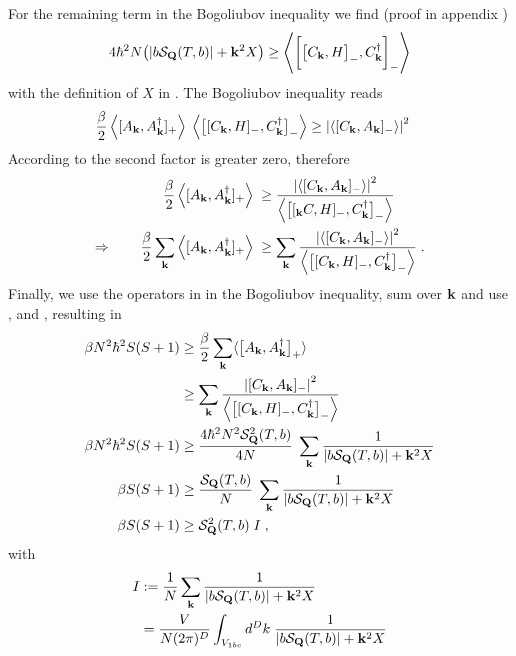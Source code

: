 %
For the remaining term in the Bogoliubov inequality we find (proof in appendix )
%
\begin{align}\label{eq:MW:3}
4 \hbar^{2} N\big( \abs{b {\cal S}_{\mathbf Q}(T,b)} +  \mathbf k^{2} X \big)\ge 
 \left\langle\bigg[ \big[C_{\mathbf k},H  \big]_{-},C^{\dagger}_{\mathbf k} \bigg]_{-}\right\rangle
\end{align}
%
with the definition of $X$ in .
The Bogoliubov inequality reads
%
\begin{align*}
\frac{\beta}{2} \left\langle[A_{\mathbf k},A_{\mathbf k}^{\dagger}]_{+}\right\rangle\;
\left\langle\big[[C_{\mathbf k},H]_{-},C_{\mathbf k}^{\dagger}\big]_{-}\right\rangle &\ge \abs{\left\langle[C_{\mathbf k},A_{\mathbf k}]_{-}\right\rangle}^{2}
\end{align*}
%
According to  the second factor is greater zero, therefore
%
\begin{align*}
\frac{\beta}{2} \left\langle[A_{\mathbf k},A_{\mathbf k}^{\dagger}]_{+}\right\rangle\;
 &\ge \frac{\abs{\left\langle[C_{\mathbf k},A_{\mathbf k}]_{-}\right\rangle}^{2}}{ \left\langle\big[[_{\mathbf k}C,H]_{-},C_{\mathbf k}^{\dagger}\big]_{-}\right\rangle}\\
\Rightarrow\qquad \frac{\beta}{2}\sum_{\mathbf k} \left\langle[A_{\mathbf k},A_{\mathbf k}^{\dagger}]_{+}\right\rangle\;
 &\ge\sum_{\mathbf k} \frac{\abs{\left\langle[C_{\mathbf k},A_{\mathbf k}]_{-}\right\rangle}^{2}}{ \left\langle\big[[C_{\mathbf k},H]_{-},C_{\mathbf k}^{\dagger}\big]_{-}\right\rangle}\;.
\end{align*}
%
Finally, we use the operators in  in the Bogoliubov inequality, sum over
$\mathbf k$ and use , and , resulting in
%
\begin{align*}
 \beta N^{2} \hbar^{2} S(S+1) &\ge 
   \frac{\beta}{2}\sum_{\mathbf k} \langle\big[ A_{\mathbf k},A_{\mathbf k}^{\dagger} \big]_{+}  \rangle  \\
 & \ge\sum_{\mathbf k} \frac{\abs{[C_{\mathbf k},A_{\mathbf k}]_{-}}^{2}}{ \left\langle\big[[C_{\mathbf k},H]_{-},C_{\mathbf k}^{\dagger}\big]_{-}\right\rangle}\\
     \beta N^{2} \hbar^{2} S(S+1)   &\ge \frac{4\hbar^{2} N^{2} {\cal S}^{2}_{\mathbf Q}(T,b)}{4  N} \;\sum_{\mathbf k} \frac{1}{
   \abs{b {\cal S}_{\mathbf Q}(T,b)} +  \mathbf k^{2}   X }\\
 \beta  S(S+1)   &\ge \frac{{\cal S}_{\mathbf Q}(T,b)}{ N} \;\sum_{\mathbf k} \frac{1}{
   \abs{b {\cal S}_{\mathbf Q}(T,b)} +  \mathbf k^{2}   X }\\
 \beta  S(S+1)       &\ge {\cal S}^{2}_{\mathbf Q}(T,b)\;I\;,
\end{align*}
%
with
%
\begin{align*}
I&:= \frac{1}{N}\sum_{\mathbf k} \frac{1}{
   \abs{b {\cal S}_{\mathbf Q}(T,b)} +  \mathbf k^{2}  X }\\
   &=\frac{V}{N (2\pi)^{D}} \int_{V_{1bc}} d^{D}k\;
   \frac{1}{
   \abs{b {\cal S}_{\mathbf Q}(T,b)} +  \mathbf k^{2} X }
\end{align*}
